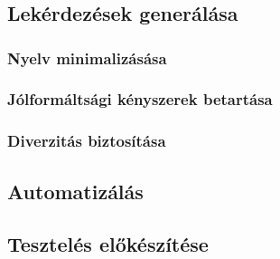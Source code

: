 \chapter{\ellaboration}
\section{Lekérdezések generálása}

\subsection{Nyelv minimalizásása}
\subsection{Jólformáltsági kényszerek betartása}
\subsection{Diverzitás biztosítása}


\section{Automatizálás}

\section{Tesztelés előkészítése}
